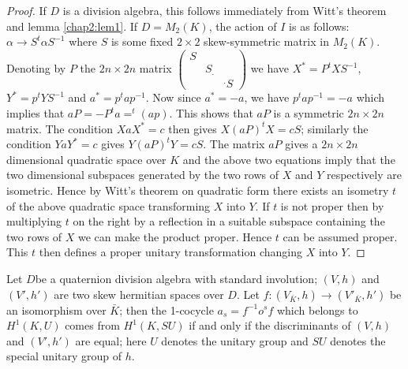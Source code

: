 \begin{proof}
If $D$ is a division algebra, this follows immediately from Witt's
theorem and lemma \ref{chap2:lem1}. If $D= M_2 (K)$, the action of $I$ is as
follows: $\alpha \rightarrow S^t \alpha S^{-1}$ where $S$
is some fixed $2 \times2$  skew-symmetric matrix in $M_2
(K)$. Denoting by $P$ the $2n \times 2n$ matrix  
$\begin{pmatrix}
S & &\\
& S_. &\\
& & ^.S
\end{pmatrix}
$ we have $X^* = P^t XS^{-1}$, $Y^* = p^t YS^{-1}$ and
$a^*=p^tap^{-1}$. Now since $a^* =-a$, we have $p^t ap^{-1} =-a $
which implies that $aP =- P^t a = ^t(ap)$. This shows  that $aP$ is a
symmetric $2n \times 2n$ matrix. The condition $XaX^*=c$ then gives
$X(aP)^tX=cS$; similarly the condition $YaY^*=c$ gives
$Y(aP)^tY=cS$. The matrix $aP$ gives  a $2n \times 2n$ dimensional
quadratic space over $K$ and the above two equations imply that the
two dimensional subspaces generated by the two rows of $X$ and $Y$
respectively are isometric. Hence by Witt's theorem on quadratic form
there exists an isometry $t$  of the above quadratic space
transforming $X$ into $Y$. If $t$ is not proper then by multiplying
$t$ on the right by a reflection in a suitable subspace containing the
two rows of $X$ we can make the product proper. Hence $t$ can be
assumed proper. This $t$ then defines a proper unitary transformation
changing $X$ into $Y$. 
\end{proof}

\begin{lem}\label{chap2:lem3}
Let $D$\pageoriginale be a quaternion division algebra with standard
involution; $(V,h)$ and $(V', h')$ are two skew hermitian spaces  over
$D$. Let $f:(V_{\bar{K}},h) \rightarrow(V'_{\bar{K}},h')$ be an isomorphism
over $\bar{K}$; then the 1-cocycle $a_s=f^{-1} o {}^s f$ which belongs
to $H^1(K,U)$ comes from $H^1(K,SU)$ if and only if the discriminants of
$(V,h)$ and $(V',h')$ are equal; here $U$ denotes the unitary
group and $SU$ denotes the special unitary group of $h$. 
\end{lem} 

